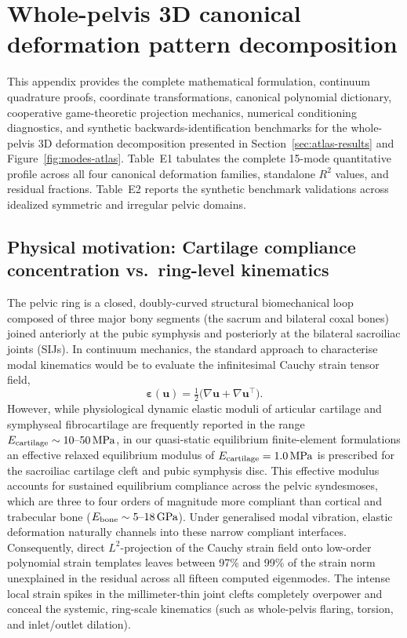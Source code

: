 \documentclass[11pt]{article}
\begin{document}
\clearpage
\section{Whole-pelvis 3D canonical deformation pattern decomposition}
\label{sec:appendix-global-deformation}

This appendix provides the complete mathematical formulation, continuum quadrature proofs, coordinate transformations, canonical polynomial dictionary, cooperative game-theoretic projection mechanics, numerical conditioning diagnostics, and synthetic backwards-identification benchmarks for the whole-pelvis 3D deformation decomposition presented in Section~\ref{sec:atlas-results} and Figure~\ref{fig:modes-atlas}.
Table~E1 tabulates the complete 15-mode quantitative profile across all four canonical deformation families, standalone $R^2$ values, and residual fractions.
Table~E2 reports the synthetic benchmark validations across idealized symmetric and irregular pelvic domains.

\subsection{Physical motivation: Cartilage compliance concentration vs.\ ring-level kinematics}
The pelvic ring is a closed, doubly-curved structural biomechanical loop composed of three major bony segments (the sacrum and bilateral coxal bones) joined anteriorly at the pubic symphysis and posteriorly at the bilateral sacroiliac joints (SIJs).
In continuum mechanics, the standard approach to characterise modal kinematics would be to evaluate the infinitesimal Cauchy strain tensor field,
\begin{equation}
\boldsymbol\varepsilon(\mathbf u) = \tfrac{1}{2}\big(\nabla \mathbf u + \nabla \mathbf u^\top\big).
\label{eq:cauchy-strain}
\end{equation}
However, while physiological dynamic elastic moduli of articular cartilage and symphyseal fibrocartilage are frequently reported in the range $E_{\rm cartilage} \sim 10\text{--}50\,\mathrm{MPa}$, in our quasi-static equilibrium finite-element formulations an effective relaxed equilibrium modulus of $E_{\rm cartilage} = 1.0\,\mathrm{MPa}$ is prescribed for the sacroiliac cartilage cleft and pubic symphysis disc.
This effective modulus accounts for sustained equilibrium compliance across the pelvic syndesmoses, which are three to four orders of magnitude more compliant than cortical and trabecular bone ($E_{\rm bone} \sim 5\text{--}18\,\mathrm{GPa}$).
Under generalised modal vibration, elastic deformation naturally channels into these narrow compliant interfaces.
Consequently, direct $L^2$-projection of the Cauchy strain field onto low-order polynomial strain templates leaves between 97\% and 99\% of the strain norm unexplained in the residual across all fifteen computed eigenmodes.
The intense local strain spikes in the millimeter-thin joint clefts completely overpower and conceal the systemic, ring-scale kinematics (such as whole-pelvis flaring, torsion, and inlet/outlet dilation).
\end{document}

